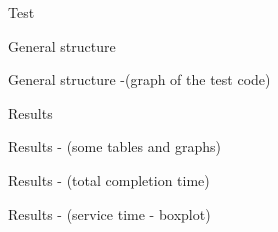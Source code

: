\documentclass[xcolor=dvipsnames]{beamer}
\begin{document}
\begin{section}{Test}












\begin{frame}{\hskip 0.3cm General structure}
\end{frame}












\begin{frame}{\hskip 0.3cm General structure -(graph of the test code)}
\end{frame}












\begin{frame}{\hskip 0.3cm Results}
\end{frame}












\begin{frame}{\hskip 0.3cm Results - (some tables and graphs)}
\end{frame}












\begin{frame}{\hskip 0.3cm Results - (total completion time)}
\end{frame}












\begin{frame}{\hskip 0.3cm Results - (service time - boxplot)}
\end{frame}













\end{section}
\end{document}

